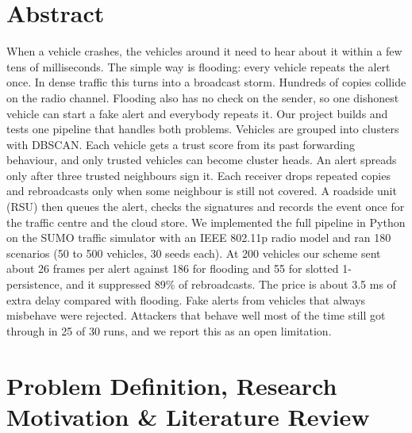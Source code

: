 \documentclass[11pt, a4paper]{article}
\begin{document}
\section{Abstract}
\noindent
When a vehicle crashes, the vehicles around it need to hear about it within a few tens of milliseconds. The simple way is flooding: every vehicle repeats the alert once. In dense traffic this turns into a broadcast storm. Hundreds of copies collide on the radio channel. Flooding also has no check on the sender, so one dishonest vehicle can start a fake alert and everybody repeats it. Our project builds and tests one pipeline that handles both problems. Vehicles are grouped into clusters with DBSCAN. Each vehicle gets a trust score from its past forwarding behaviour, and only trusted vehicles can become cluster heads. An alert spreads only after three trusted neighbours sign it. Each receiver drops repeated copies and rebroadcasts only when some neighbour is still not covered. A roadside unit (RSU) then queues the alert, checks the signatures and records the event once for the traffic centre and the cloud store. We implemented the full pipeline in Python on the SUMO traffic simulator with an IEEE 802.11p radio model and ran 180 scenarios (50 to 500 vehicles, 30 seeds each). At 200 vehicles our scheme sent about 26 frames per alert against 186 for flooding and 55 for slotted 1-persistence, and it suppressed 89\% of rebroadcasts. The price is about 3.5 ms of extra delay compared with flooding. Fake alerts from vehicles that always misbehave were rejected. Attackers that behave well most of the time still got through in 25 of 30 runs, and we report this as an open limitation.

\section{Problem Definition, Research Motivation \& Literature Review}
\end{document}

